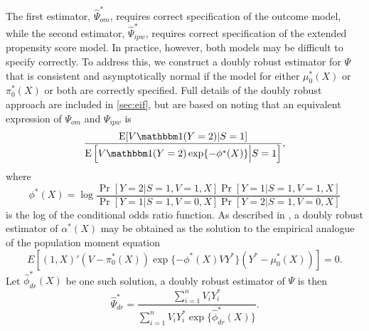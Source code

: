 \documentclass[11pt]{article}
\begin{document}
The first estimator, $\widehat{\Psi}_{om}^*$, requires  correct specification of the outcome model, while the second estimator, $\widehat{\Psi}_{ipw}^*$, requires correct specification of the extended propensity score model. %
In practice, however, both models may be difficult to specify correctly. To address this, we construct a doubly robust estimator for $\Psi$ that is consistent and asymptotically normal if the model for either $\mu^*_0(X)$ or $\pi^*_0(X)$ or both are correctly specified. Full details of the doubly robust approach are included in \ref{sec:eif}, but are based on noting that an equivalent expression of $\Psi_{om}$ and $\Psi_{ipw}$ is
\begin{equation*}
    \dfrac{\E[V \mathbbm 1 (Y = 2)|S =1]}{\E\left[V\mathbbm 1 (Y = 2) \exp\{-\phi^*(X)\}\Big| S = 1 \right]},
\end{equation*}
where 
\[\phi^*(X) = \log \dfrac{\Pr[Y=2|S=1, V=1,X]\Pr[Y=1|S=1, V=1,X]}{\Pr[Y=1|S=1, V=0,X]\Pr[Y=2|S=1, V=0,X]}\]
is the log of the conditional odds ratio function. As described in \textcite{tchetgen_tchetgen_doubly_2010}, a doubly robust estimator of $\alpha^*(X)$ may be obtained as the solution to the empirical analogue of the population moment equation
\[E[(1,X)'(V-\pi_0^*(X))\exp\{-\phi^*(X)VY^*\}(Y^* - \mu_0^*(X))] = 0.\]
Let $\widehat{\phi}_{dr}^*(X)$ be one such solution, a doubly robust estimator of $\Psi$ is then
\begin{equation}\label{eqn:dr_estimator}
    \widehat{\Psi}_{dr}^* = \dfrac{\sum_{i=1}^n V_i Y^*_i}{\sum_{i=1}^nV_iY^*_i \exp\{\widehat{\phi}_{dr}^*(X)\}}.
\end{equation}
\end{document}
